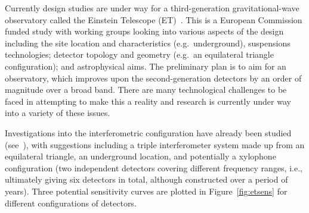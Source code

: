 \documentclass{article}
\begin{document}
Currently design studies are under way for a third-generation gravitational-wave
observatory called the Einstein Telescope (ET)~\cite{ETweb}. This is a European
Commission funded study with working groups looking into various aspects of the
design including the site location and characteristics (e.g.\, underground),
suspensions technologies; detector topology and geometry (e.g.\, an equilateral
triangle configuration); and astrophysical aims. The preliminary plan is to
aim for an observatory, which improves upon the second-generation detectors by
an order of magnitude over a broad band. There are many technological challenges
to be faced in attempting to make this a reality and research is currently under
way into a variety of these issues.

Investigations into the interferometric configuration have already been studied
(see~\cite{Freise:2008, Hild:2008, Hild:2010}), with suggestions including a
triple interferometer system made up from an equilateral triangle, an
underground location, and potentially a xylophone configuration (two independent
detectors covering different frequency ranges, i.e., ultimately giving six
detectors in total, although constructed over a period of years). Three
potential sensitivity curves are plotted in Figure~\ref{fig:etsens} for different
configurations of detectors.

\end{document}
